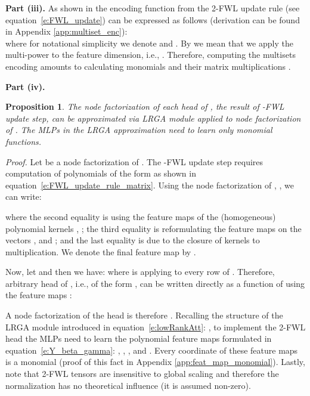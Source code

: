 \documentclass{article} \usepackage{iclr2021_conference,times}
\newcommand{\ie}{{i.e.}}
\newtheorem{proposition}{Proposition}
\def\eqref#1{equation~\ref{#1}}
\begin{document}
\textbf{Part (iii).}
As shown in \citep{maron2019provably} the encoding function  from the 2-FWL update rule (see \eqref{e:FWL_update}) can be expressed as follows (derivation can be found in Appendix \ref{app:multiset_enc}):
 \\
where for notational simplicity we denote  and . By  we mean that we apply the multi-power  to the feature dimension, \ie, . Therefore, computing the multisets encoding amounts to calculating monomials  and their matrix multiplications . 

\textbf{Part (iv).}
\begin{proposition} \label{prop:poly_kernels}
The node factorization of each head of , the result of -FWL update step, can be approximated via LRGA module applied to  node factorization of . The MLPs in the LRGA approximation need to learn only monomial functions. 
\end{proposition}
\textit{Proof.}
Let  be a node factorization of . The -FWL update step requires computation of polynomials of the form  as shown in \eqref{e:FWL_update_rule_matrix}. Using the node factorization of  , , we can write:
\vspace{-5pt}

where the second equality is using the feature maps  of the (homogeneous) polynomial kernels \citep{Vapnik1998}, ; the third equality is reformulating the feature maps  on the vectors , and ; and the last equality is due to the closure of kernels to multiplication. We denote the final feature map by . 

Now, let  and  then we have:
 where  is applying  to every row of .
Therefore, arbitrary head of , \ie, of the form , can be written directly as a function of  using the feature maps :

A node factorization of the head  is therefore . Recalling the structure of the LRGA module introduced in \eqref{e:lowRankAtt}: , to implement the 2-FWL head the MLPs  need to learn the polynomial feature maps formulated in \eqref{e:Y_beta_gamma}: , , , and . Every coordinate of these feature maps is a monomial (proof of this fact in Appendix \ref{app:feat_map_monomial}). Lastly, 
note that 2-FWL tensors   are insensitive to global scaling and therefore the normalization  has no theoretical influence (it is assumed non-zero). \qedsymbol
\end{document}
